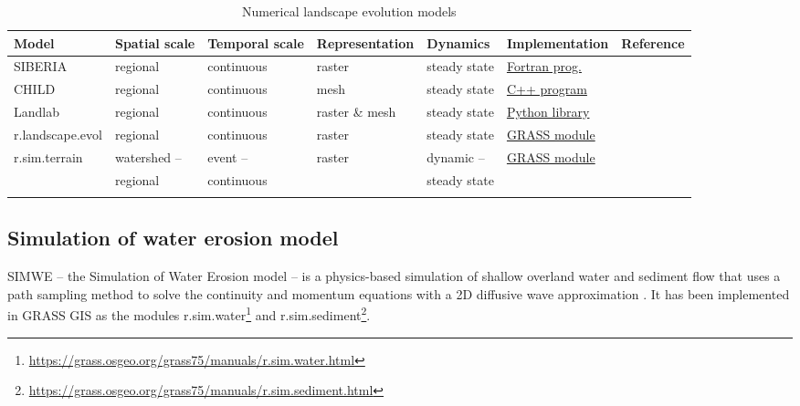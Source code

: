 \documentclass[esurf, manuscript]{copernicus}
\begin{document}
\begin{table}
\small
\caption{Numerical landscape evolution models}
\begin{tabu} to \textwidth {XXXXXXl}
\toprule
Model & Spatial scale &  Temporal scale & Representation & Dynamics & Implementation & Reference\\
\midrule
SIBERIA & regional & continuous & raster & steady state & \href{https://csdms.colorado.edu/wiki/Model:SIBERIA}{Fortran prog.} & \cite{Willgoose2005}\\
CHILD & regional & continuous & mesh & steady state & \href{https://csdms.colorado.edu/wiki/Model:CHILD}{C++ program} & \cite{Tucker2001}\\
Landlab & regional & continuous & raster \& mesh & steady state & \href{https://github.com/landlab/}{Python library} & \cite{Hobley2017}\\
r.landscape.evol  & regional & continuous & raster &  steady state & \href{https://grass.osgeo.org/grass74/manuals/addons/r.landscape.evol.html}{GRASS module} & \cite{Barton2010}\\
r.sim.terrain & watershed -- & event -- & raster & dynamic -- & \href{https://github.com/baharmon/landscape_evolution}{GRASS module} &\\ %
& regional & continuous && steady state & &\\
\bottomrule
\\
\end{tabu}
\label{table:evolution_models} 
\end{table}


\subsection{Simulation of water erosion model} \label{simwe}
SIMWE -- the Simulation of Water Erosion model -- 
is a physics-based simulation of shallow overland water and sediment flow
that uses a path sampling method to solve the continuity and momentum equations 
with a 2D diffusive wave approximation 
\cite{Mitas1998,Mitasova2001,Mitasova2004}.
It has been implemented in GRASS GIS as the modules 
r.sim.water\footnote{\url{https://grass.osgeo.org/grass75/manuals/r.sim.water.html}} 
and r.sim.sediment\footnote{\url{https://grass.osgeo.org/grass75/manuals/r.sim.sediment.html}}.
\end{document}
